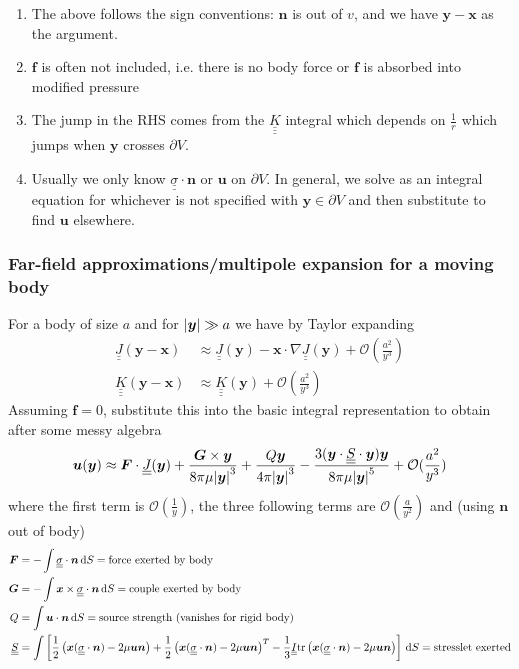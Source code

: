 \documentclass{jknotes}
\newcommand{\dunder}[1]{\underline{\underline{#1}}}
\newcommand{\x}{\bm{x}}
\newcommand{\inv}[1]{\frac{1}{#1}}
\renewcommand{\u}{\bm{u}}
\newcommand{\y}{\bm{y}}
\begin{document}
\begin{enumerate}
	\item The above follows the sign conventions: $\bm{n}$ is out of $v$, and
		we have $\y - \x$ as  the argument.
	\item $\bm{f}$ is often not included, i.e. there is no body force or
		$\bm{f}$ is absorbed into modified pressure
	\item The jump in the RHS comes from the $\dunder{\underline{K}}$ integral
		which depends on $\inv{r}$ which jumps when $\y$ crosses $\partial
		V$.
	\item Usually we only know $\dunder{\sigma}\cdot\bm{n}$ or $\bm{u}$ on
		$\partial V$. In general, we solve as an integral equation for
		whichever is not specified with $\y \in \partial V$ and then
		substitute to find $\u$ elsewhere.
\end{enumerate}

\subsubsection{Far-field approximations/multipole expansion for a moving body}
For a body of size $a$ and for $\abs{\y} \gg a$ we have by Taylor expanding
\begin{align}
	\dunder{J}(\y-\x) &\approx \dunder{J}(\y) - \x \cdot \nabla \dunder{J}(\y)
	+ \mathcal{O}(\frac{a^2}{y^3}) \\
	\dunder{\underline{K}}(\y-\x) &\approx \dunder{\underline{K}}(\y) +
	\mathcal{O}(\frac{a^2}{y^3})
\end{align}
Assuming $\bm{f} = 0$, substitute this into the basic integral representation
to obtain after some messy algebra
\begin{equation}
	\u(\y) \approx \bm{F} \cdot \dunder{J}(\y) + \frac{\bm{G} \times
		\y}{8\pi\mu \abs{\y}^3} + \frac{Q\y}{4\pi\abs{\y}^3} - \frac{3 (\y
		\cdot \dunder{S} \cdot \y)\y}{8\pi\mu \abs{\y}^5} +
		\mathcal{O}(\frac{a^2}{y^3})
\end{equation}
where the first term is $\mathcal{O}(\inv{y})$, the three following terms are
$\mathcal{O}(\frac{a}{y^2})$ and (using $\bm{n}$ out of body)
\begin{align}
	\bm{F} &= -\int \dunder{\sigma}\cdot\bm{n}\,\diffd S = \text{force exerted
	by body}\\
	\bm{G} &= -\int \x \times \dunder{\sigma} \cdot \bm{n}\,\diffd S =
	\text{couple exerted by body} \\
	Q &= \int \u \cdot \bm{n} \,\diffd S = \text{source strength (vanishes for
	rigid body)} \\
	\dunder{S} &= \int \left[ \frac{1}{2} \left( \x
			(\dunder{\sigma}\cdot\bm{n}) - 2 \mu \u \bm{n}\right) +
			\frac{1}{2}\left( \x
				(\dunder{\sigma}\cdot\bm{n}) - 2 \mu \u \bm{n}\right)^T -
				\frac{1}{3}\dunder{I} \text{tr}\left( \x
			(\dunder{\sigma}\cdot\bm{n}) - 2 \mu \u \bm{n}\right)\right] \,
			\diffd S = \text{stresslet exerted}
\end{align}
\end{document}
